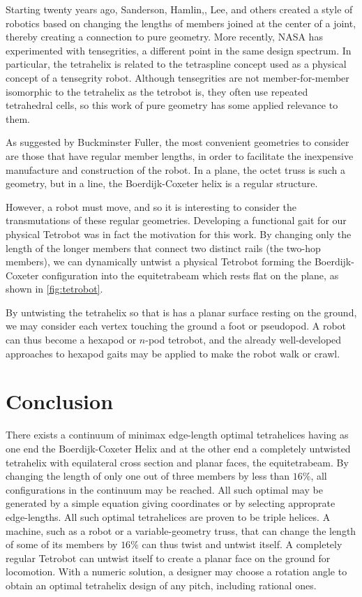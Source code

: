 \documentclass[twocolumn,10pt]{asme2ej}
\begin{document}
Starting twenty years ago, Sanderson\cite{sanderson1996modular},
Hamlin,\cite{TetrobotBook}, Lee\cite{lee2002dynamic}, and others
 created a style of robotics based on changing
the lengths of members joined at the center of a joint, thereby
creating a connection to pure geometry. More recently, NASA has
experimented with tensegrities\cite{NTRT,chen2017soft}, a different point in the
same design spectrum. In particular, the tetrahelix is related to the
tetraspline\cite{mirletz2014} concept used as a physical concept of a tensegrity robot.
Although tensegrities are not member-for-member isomorphic to the tetrahelix
as the tetrobot is, they often use repeated tetrahedral cells, so this
work of pure geometry has some applied relevance to them.

As suggested by Buckminster Fuller, the most convenient geometries to
consider are those that have regular member lengths, in order to
facilitate the inexpensive manufacture and construction of the robot.
In a plane, the octet truss\cite{richard1961synergetic} is such a geometry, but in a line, the
Boerdijk-Coxeter helix is a regular structure.

However, a robot must move, and so it is interesting to consider the
transmutations of these regular geometries. Developing a functional
gait for our physical Tetrobot was in fact the motivation
for this work.
By changing only the length of the longer members that connect two
distinct rails (the two-hop members), we can dynamically untwist a physical Tetrobot
forming the Boerdijk-Coxeter configuration into the equitetrabeam which rests flat on the plane,
as shown in \cref{fig:tetrobot}.

By untwisting the tetrahelix so that is has a planar surface resting on the ground,
we may consider each vertex touching the ground a foot or pseudopod. A robot can thus
become a hexapod or $n$-pod tetrobot, and the already well-developed approaches to
hexapod gaits may be applied to make the robot walk or crawl.

\section{Conclusion}

There exists a continuum of minimax edge-length optimal tetrahelices
having as one end the Boerdijk-Coxeter Helix and at  the
other end a completely untwisted tetrahelix with equilateral cross
section and planar faces, the equitetrabeam.
By changing the length of only one out of three members by less than $16\%$,
all configurations in the continuum may be reached.
All such optimal may be generated by a simple equation giving coordinates or by
selecting approprate edge-lengths.
All such optimal tetrahelices are proven to be triple helices.
A machine, such as a robot or a variable-geometry truss, that can change
the length of some of its members by $16\%$ can thus twist and untwist itself.
A completely regular Tetrobot can untwist itself to create a planar
face on the ground for locomotion.
With a numeric solution, a designer may choose
a rotation angle to obtain an optimal tetrahelix design
of any pitch, including rational ones.
\end{document}
